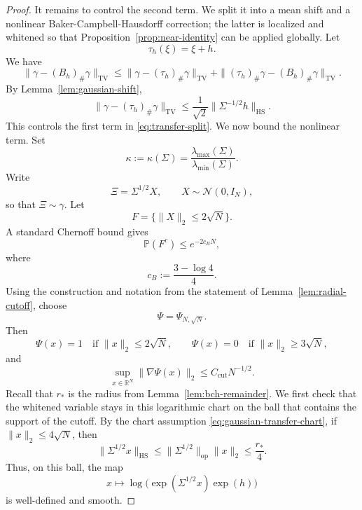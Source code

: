 \documentclass[10pt,a4paper]{amsart}
\newcommand{\HS}{\mathrm{HS}}
\newcommand{\Prob}{\mathbb{P}}
\newcommand{\R}{\mathbb{R}}
\newcommand{\TV}{\mathrm{TV}}
\newcommand{\op}{\mathrm{op}}
\begin{document}
\begin{proof}
It remains to control the second term. We split it into a mean shift and a nonlinear Baker-Campbell-Hausdorff correction; the latter is localized and whitened so that Proposition~\ref{prop:near-identity} can be applied globally. Let
\[
\tau_h(\xi)=\xi+h.
\]
We have
\begin{equation}
\label{eq:transfer-split}
\|\gamma-(B_h)_\#\gamma\|_{\TV}
\le
\|\gamma-(\tau_h)_\#\gamma\|_{\TV}
+
\|(\tau_h)_\#\gamma-(B_h)_\#\gamma\|_{\TV}.
\end{equation}
By Lemma~\ref{lem:gaussian-shift},
\begin{equation}
\label{eq:transfer-gaussian-shift}
\|\gamma-(\tau_h)_\#\gamma\|_{\TV}
\le
\frac1{\sqrt2}\|\Sigma^{-1/2}h\|_{\HS}.
\end{equation}
This controls the first term in \eqref{eq:transfer-split}. We now bound the nonlinear term. Set
\[
\kappa:=\kappa(\Sigma)
=
\frac{\lambda_{\max}(\Sigma)}{\lambda_{\min}(\Sigma)}.
\]
Write
\[
\Xi=\Sigma^{1/2}X,
\qquad
X\sim\mathcal N(0,I_N),
\]
so that \(\Xi\sim\gamma\). Let
\[
F=\{\|X\|_2\le 2\sqrt N\}.
\]
A standard Chernoff bound gives
\begin{equation}
\label{eq:transfer-X-tail}
\Prob(F^c)\le e^{-2c_BN},
\end{equation}
where
\[
c_B:=\frac{3-\log 4}{4}.
\]
Using the construction and notation from the statement of Lemma~\ref{lem:radial-cutoff}, choose
\[
\Psi=\Psi_{N,\sqrt N}.
\]
Then
\[
\Psi(x)=1 \quad\text{if }\|x\|_2\le 2\sqrt N,
\qquad
\Psi(x)=0 \quad\text{if }\|x\|_2\ge 3\sqrt N,
\]
and
\begin{equation}
\label{eq:transfer-cutoff-grad}
\sup_{x\in\R^N}\|\nabla\Psi(x)\|_2
\le
C_{\mathrm{cut}}N^{-1/2}.
\end{equation}
Recall that $r_\ast$ is the radius from Lemma~\ref{lem:bch-remainder}. We first check that the whitened variable stays in this logarithmic chart on the ball that contains the support of the cutoff.
By the chart assumption \eqref{eq:gaussian-transfer-chart}, if
\(\|x\|_2\le 4\sqrt N\), then
\[
\|\Sigma^{1/2}x\|_{\HS}
\le
\|\Sigma^{1/2}\|_{\op}\|x\|_2
\le
\frac{r_\ast}{4}.
\]
Thus, on this ball, the map
\[
x\mapsto \log\!\bigl(\exp(\Sigma^{1/2}x)\exp(h)\bigr)
\]
is well-defined and smooth.


\end{proof}
\end{document}
